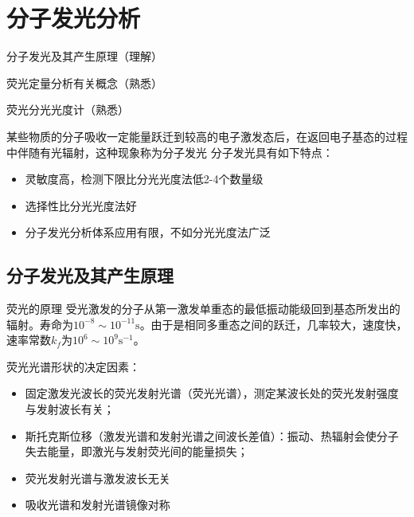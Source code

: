 \chapter{分子发光分析}

\begin{introduction}
	\item 分子发光及其产生原理（理解）
	\item 荧光定量分析有关概念（熟悉）
	\item 荧光分光光度计（熟悉）
\end{introduction}


某些物质的分子吸收一定能量跃迁到较高的电子激发态后，在返回电子基态的过程中伴随有光辐射，这种现象称为分子发光
分子发光具有如下特点：
\begin{itemize}
	\item 灵敏度高，检测下限比分光光度法低2-4个数量级
	\item 选择性比分光光度法好
	\item 分子发光分析体系应用有限，不如分光光度法广泛
\end{itemize}
\section{分子发光及其产生原理}

\begin{definition*}{荧光的原理}
	受光激发的分子从第一激发单重态的最低振动能级回到基态所发出的辐射。寿命为$10^{-8} \sim 10^{-11}\mathrm{s}$。由于是相同多重态之间的跃迁，几率较大，速度快，速率常数$k_f$为$10^{6}\sim 10^{9} \mathrm{s}^{-1}$。
\end{definition*}
荧光光谱形状的决定因素：
\begin{itemize}
	\item 固定激发光波长的荧光发射光谱（荧光光谱），测定某波长处的荧光发射强度与发射波长有关；
	\item 斯托克斯位移（激发光谱和发射光谱之间波长差值）：振动、热辐射会使分子失去能量，即激光与发射荧光间的能量损失；
	\item 荧光发射光谱与激发波长无关
	\item 吸收光谱和发射光谱镜像对称
\end{itemize}

